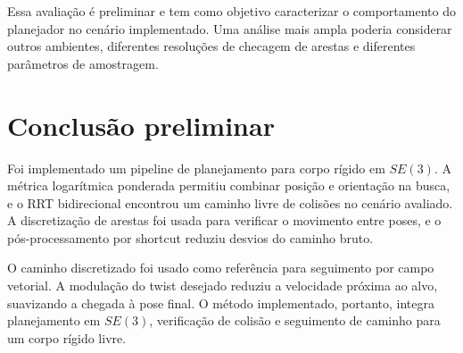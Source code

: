 \documentclass[12pt,a4paper]{article}
\begin{document}
Essa avaliação é preliminar e tem como objetivo caracterizar o comportamento do
planejador no cenário implementado. Uma análise mais ampla poderia considerar
outros ambientes, diferentes resoluções de checagem de arestas e diferentes
parâmetros de amostragem.

\section{Conclusão preliminar}

Foi implementado um pipeline de planejamento para corpo rígido em \(SE(3)\). A
métrica logarítmica ponderada permitiu combinar posição e orientação na busca, e
o RRT bidirecional encontrou um caminho livre de colisões no cenário avaliado. A
discretização de arestas foi usada para verificar o movimento entre poses, e o
pós-processamento por shortcut reduziu desvios do caminho bruto.

O caminho discretizado foi usado como referência para seguimento por campo
vetorial. A modulação do twist desejado reduziu a velocidade próxima ao alvo,
suavizando a chegada à pose final. O método implementado, portanto, integra
planejamento em \(SE(3)\), verificação de colisão e seguimento de caminho para um
corpo rígido livre.



\end{document}
